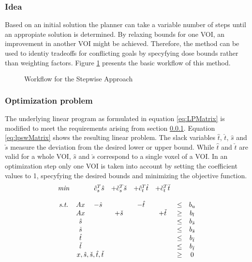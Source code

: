 \documentclass[12pt]{article}
\begin{document}
	\subsubsection{Idea}
		\label{subsec:lpswIdea}
		Based on an initial solution the planner can take a variable number of steps until an appropiate solution is determined. By relaxing bounds for one VOI, an improvement in another VOI might be achieved. Therefore, the method can be used to identiy tradeoffs for conflicting goals by specyfying dose bounds rather than weighting factors. Figure \ref{fig:lpswWorkflow} presents the basic workflow of this method.
		
		\begin{figure}[ht]
			\centering
			 
			\caption{Workflow for the Stepwise Approach}
			\label{fig:lpswWorkflow}
		\end{figure}
		
	\subsubsection{Optimization problem}
		The underlying linear program as formulated in equation \ref{eq:LPMatrix} is modified to meet the requirements arising from section \ref{subsec:lpswIdea}. Equation \ref{eq:lpswMatrix} shows the resulting linear problem. The slack variables $\hat{t}$, $\check{t}$, $\hat{s}$ and $\check{s}$ measure the deviation from the desired lower or upper bound. While $\hat{t}$ and $\check{t}$ are valid for a whole VOI, $\hat{s}$ and $\check{s}$ correspond to a single voxel of a VOI. In an optimization step only one VOI is taken into account by setting the coefficient values to 1, specyfying the desired bounds and minimizing the objective function.
		\begin{equation}
			\label{eq:lpswMatrix}
			\begin{matrix}
			\textit{min} &            & ~\hat{c}_s^T\hat{s} & +\check{c}_s^T\check{s}    & +\hat{c}_t^T\hat{t} & +\check{c}_t^T\check{t} & & \\\\
			\textit{s.t.} & Ax         & -\hat{s}            &            & -\hat{t}  &            & \leq & b_u\\
     & Ax         & 		            & +\check{s} &           & +\check{t} & \geq & b_l\\
			   	 & \hat{s}    & 		            &            &           &            & \leq & b_{\hat{s}}\\
          & \check{s}  & 	                &            &           &            & \leq & b_{\check{s}}\\
          & \hat{t}    & 		            &            &           &            & \leq & b_{\hat{t}}\\
          & \check{t}  & 	                &            &           &            & \leq & b_{\check{t}}\\
				 & \multicolumn{2}{c}{x,\hat{s},\check{s},\hat{t},\check{t}} & & & & \geq & 0
			\end{matrix}		
		\end{equation}
	
\end{document}
